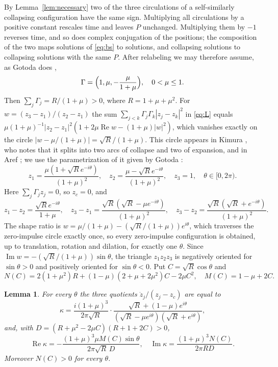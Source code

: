 \documentclass[11pt]{article}
\newtheorem{lemma}{Lemma}
\theoremstyle{definition}
\newcommand{\re}{\operatorname{Re}}
\newcommand{\im}{\operatorname{Im}}
\begin{document}
By Lemma~\ref{lem:necessary} two of the three circulations of a self-similarly collapsing configuration have the same sign. Multiplying all circulations by a positive constant rescales time and leaves $P$ unchanged. Multiplying them by $-1$ reverses time, and so does complex conjugation of the positions; the composition of the two maps solutions of \eqref{eq:bs} to solutions, and collapsing solutions to collapsing solutions with the same $P$. After relabeling we may therefore assume, as Gotoda does \cite[Sect.~3]{gotoda2021},
\begin{equation}\label{eq:norm}
  \Gamma = \Bigl(1, \mu, -\frac{\mu}{1 + \mu}\Bigr), \quad 0 < \mu \le 1.
\end{equation}
Then $\sum_j \Gamma_j = R/(1 + \mu) > 0$, where $R = 1 + \mu + \mu^2$. For $w = (z_3 - z_1)/(z_2 - z_1)$ the sum $\sum_{j<k} \Gamma_j \Gamma_k |z_j - z_k|^2$ in \eqref{eq:L} equals $\mu(1 + \mu)^{-1} |z_2 - z_1|^2 (1 + 2\mu \re w - (1 + \mu)|w|^2)$, which vanishes exactly on the circle $|w - \mu/(1 + \mu)| = \sqrt{R}/(1 + \mu)$. This circle appears in Kimura \cite[Eqs.~(3.34)--(3.35)]{kimura1987}, who notes that it splits into two arcs of collapse and two of expansion, and in Aref \cite[Eq.~(20a)]{aref2010}; we use the parametrization of it given by Gotoda \cite[Sect.~3]{gotoda2021}:
\begin{equation}\label{eq:pos}
  z_1 = \frac{\mu(1 + \sqrt{R} e^{-i\theta})}{(1 + \mu)^2}, \quad
  z_2 = \frac{\mu - \sqrt{R} e^{-i\theta}}{(1 + \mu)^2}, \quad
  z_3 = 1, \quad \theta \in [0, 2\pi).
\end{equation}
Here $\sum_j \Gamma_j z_j = 0$, so $z_c = 0$, and
\begin{equation}\label{eq:diff}
  z_1 - z_2 = \frac{\sqrt{R} e^{-i\theta}}{1 + \mu}, \quad
  z_3 - z_1 = \frac{\sqrt{R}(\sqrt{R} - \mu e^{-i\theta})}{(1 + \mu)^2}, \quad
  z_3 - z_2 = \frac{\sqrt{R}(\sqrt{R} + e^{-i\theta})}{(1 + \mu)^2}.
\end{equation}
The shape ratio is $w = \mu/(1 + \mu) - (\sqrt{R}/(1 + \mu)) e^{i\theta}$, which traverses the zero-impulse circle exactly once, so every zero-impulse configuration is obtained, up to translation, rotation and dilation, for exactly one $\theta$. Since $\im w = -(\sqrt{R}/(1 + \mu)) \sin\theta$, the triangle $z_1 z_2 z_3$ is negatively oriented for $\sin\theta > 0$ and positively oriented for $\sin\theta < 0$. Put $C = \sqrt{R}\cos\theta$ and
\[
  N(C) = 2(1 + \mu^2) R + (1 - \mu)(2 + \mu + 2\mu^2) C - 2\mu C^2, \quad M(C) = 1 - \mu + 2C.
\]

\begin{lemma}\label{lem:rates}
For every $\theta$ the three quotients $\dot z_j/(z_j - z_c)$ are equal to
\[
  \kappa = \frac{i(1 + \mu)^3}{2\pi\sqrt{R}} \cdot \frac{\sqrt{R} + (1 - \mu) e^{i\theta}}{(\sqrt{R} - \mu e^{i\theta})(\sqrt{R} + e^{i\theta})},
\]
and, with $D = (R + \mu^2 - 2\mu C)(R + 1 + 2C) > 0$,
\[
  \re\kappa = -\frac{(1 + \mu)^3 \mu M(C) \sin\theta}{2\pi\sqrt{R}\, D}, \quad
  \im\kappa = \frac{(1 + \mu)^3 N(C)}{2\pi R D}.
\]
Moreover $N(C) > 0$ for every $\theta$.
\end{lemma}
\end{document}
